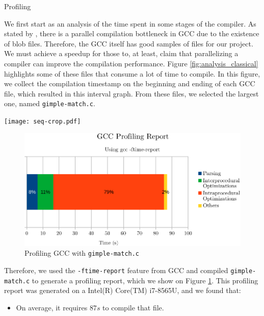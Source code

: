\begin{section}{Profiling}\label{sec:profile}

We first start as an analysis of the time spent in some stages of the compiler.
As stated by \cite{PR84402}, there is a parallel compilation bottleneck in GCC
due to the existence of blob files. Therefore, the GCC itself has good samples
of files for our project. We must achieve a speedup for those to, at least, claim
that parallelizing a compiler can improve the compilation performance.
Figure \ref{fig:analysis_classical} highlights some of these files that consume
a lot of time to compile. In this figure, we collect the compilation
timestamp on the beginning and ending of each GCC file, which resulted in this
interval graph. From these files, we selected the largest one, named
\texttt{gimple-match.c}.

\begin{landscape}
 \vspace*{-2cm}%
 \noindent%
 \hspace*{-2cm}%
    \texttt{[image: seq-crop.pdf]}
    \label{fig:analysis_classical}
\end{landscape}


\begin{figure}
\centering
	 \includegraphics[scale=1.0]{figuras/profiling-crop.pdf}
	  \caption{Profiling GCC with \texttt{gimple-match.c}}
	  \label{fig:gcc_profiling}
\end{figure}

Therefore, we used the \texttt{-ftime-report} feature from GCC and compiled
\texttt{gimple-match.c} to generate a profiling report, which we show on Figure
\ref{fig:gcc_profiling}. This profiling report was generated on a
Intel(R) Core(TM) i7-8565U, and we found that:
\begin{itemize}
    \item On average, it requires $87s$ to compile that file.


\end{itemize}
\end{section}
